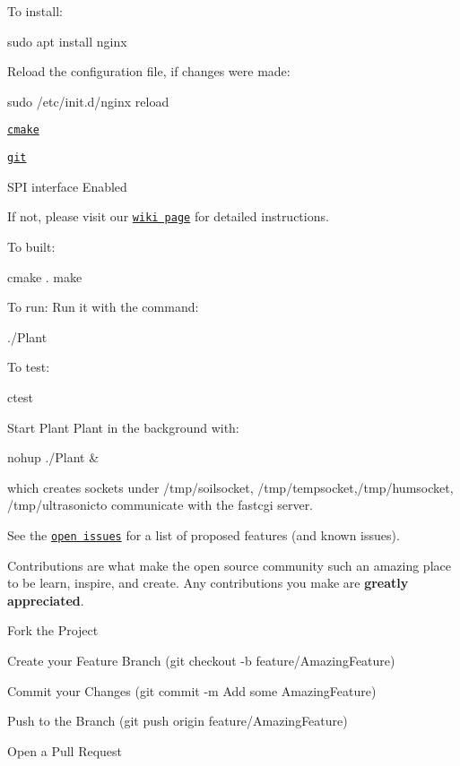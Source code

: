 To install\+: 
\begin{DoxyCode}
sudo apt install nginx
\end{DoxyCode}
 Reload the configuration file, if changes were made\+: 
\begin{DoxyCode}
sudo /etc/init.d/nginx reload
\end{DoxyCode}

\begin{DoxyItemize}
\item \href{https://cmake.org/}{\tt cmake}
\item \href{https://git-scm.com/}{\tt git}
\item S\+PI interface Enabled
\end{DoxyItemize}

If not, please visit our \href{https://github.com/atuatohu/Plant-o-Matic/wiki/Installation-guide}{\tt wiki page} for detailed instructions.

To built\+: 
\begin{DoxyCode}
cmake . 
make
\end{DoxyCode}
 To run\+: Run it with the command\+: 
\begin{DoxyCode}
./Plant
\end{DoxyCode}
 To test\+: 
\begin{DoxyCode}
ctest
\end{DoxyCode}
 

Start Plant {\ttfamily Plant} in the background with\+: 
\begin{DoxyCode}
nohup ./Plant &
\end{DoxyCode}
 which creates sockets under {\ttfamily /tmp/soilsocket}, {\ttfamily /tmp/tempsocket},{\ttfamily /tmp/humsocket}, {\ttfamily /tmp/ultrasonic}to communicate with the fastcgi server.

See the \href{https://github.com/atuatohu/Plant-o-Matic/issues}{\tt open issues} for a list of proposed features (and known issues).

Contributions are what make the open source community such an amazing place to be learn, inspire, and create. Any contributions you make are {\bfseries greatly appreciated}.


\begin{DoxyEnumerate}
\item Fork the Project
\item Create your Feature Branch ({\ttfamily git checkout -\/b feature/\+Amazing\+Feature})
\item Commit your Changes ({\ttfamily git commit -\/m \textquotesingle{}Add some Amazing\+Feature\textquotesingle{}})
\item Push to the Branch ({\ttfamily git push origin feature/\+Amazing\+Feature})
\item Open a Pull Request
\end{DoxyEnumerate}

